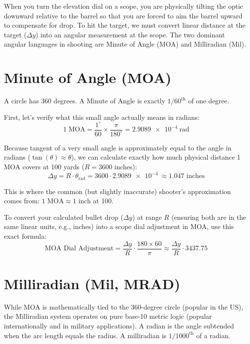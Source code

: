 \documentclass[11pt,twoside,openright]{report}
\begin{document}
When you turn the elevation dial on a scope, you are physically tilting the optic downward relative to the barrel so that you are forced to aim the barrel upward to compensate for drop. To hit the target, we must convert linear distance at the target ($\Delta y$) into an angular measurement at the scope. The two dominant angular languages in shooting are Minute of Angle (MOA) and Milliradian (Mil).

\section{Minute of Angle (MOA)}

A circle has 360 degrees. A Minute of Angle is exactly $1/60^{\text{th}}$ of one degree.

First, let's verify what this small angle actually means in radians:
\begin{equation}
  1\;\text{MOA} = \frac{1^{\circ}}{60} \times \frac{\pi}{180^{\circ}} = \SI{2.9089e-4}{\radian}
  \label{eq:moa_rad}
\end{equation}

Because tangent of a very small angle is approximately equal to the angle in radians ($\tan(\theta) \approx \theta$), we can calculate exactly how much physical distance 1 MOA covers at 100 yards ($R = 3600$ inches):
$$ \Delta y = R \cdot \theta_{\text{rad}} = 3600 \cdot \SI{2.9089e-4}{} \approx 1.047 \text{ inches} $$

This is where the common (but slightly inaccurate) shooter's approximation comes from: $1\;\text{MOA} \approx 1$ inch at \SI{100}{\yard}. 

To convert your calculated bullet drop ($\Delta y$) at range $R$ (ensuring both are in the same linear units, e.g., inches) into a scope dial adjustment in MOA, use this exact formula:
\begin{equation}
  \boxed{\text{MOA Dial Adjustment} = \frac{\Delta y}{R} \cdot \frac{180 \times 60}{\pi} \approx \frac{\Delta y}{R} \cdot 3437.75}
  \label{eq:moa_calc}
\end{equation}

\section{Milliradian (Mil, MRAD)}

While MOA is mathematically tied to the 360-degree circle (popular in the US), the Milliradian system operates on pure base-10 metric logic (popular internationally and in military applications). A radian is the angle subtended when the arc length equals the radius. A milliradian is $1/1000^{\text{th}}$ of a radian.
\end{document}
